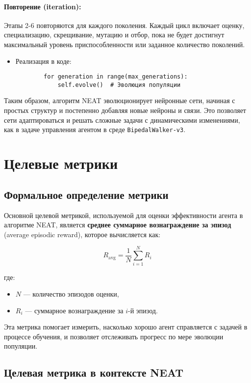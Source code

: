 \documentclass[a4paper,12pt]{article}
\begin{document}
\paragraph{Повторение (iteration):}

Этапы 2-6 повторяются для каждого поколения. Каждый цикл включает оценку, специализацию, скрещивание, мутацию и отбор, пока не будет достигнут максимальный уровень приспособленности или заданное количество поколений.

\begin{itemize}
	\item[] Реализация в коде:
	\begin{lstlisting}
		for generation in range(max_generations):
			self.evolve()  # Эволюция популяции
	\end{lstlisting}
\end{itemize}

Таким образом, алгоритм NEAT эволюционирует нейронные сети, начиная с простых структур и постепенно добавляя новые нейроны и связи. Это позволяет сети адаптироваться и решать сложные задачи с динамическими изменениями, как в задаче управления агентом в среде \texttt{BipedalWalker-v3}.
\newpage
\section{Целевые метрики}

\subsection{Формальное определение метрики}

Основной целевой метрикой, используемой для оценки эффективности агента в алгоритме NEAT, является \textbf{среднее суммарное вознаграждение за эпизод} (average episodic reward), которое вычисляется как:

\[
R_{\text{avg}} = \frac{1}{N} \sum_{i=1}^{N} R_i
\]

где:
\begin{itemize}
    \item $N$ — количество эпизодов оценки,
    \item $R_i$ — суммарное вознаграждение за $i$-й эпизод.
\end{itemize}

Эта метрика помогает измерить, насколько хорошо агент справляется с задачей в процессе обучения, и позволяет отслеживать прогресс по мере эволюции популяции.

\subsection{Целевая метрика в контексте NEAT}
\end{document}
